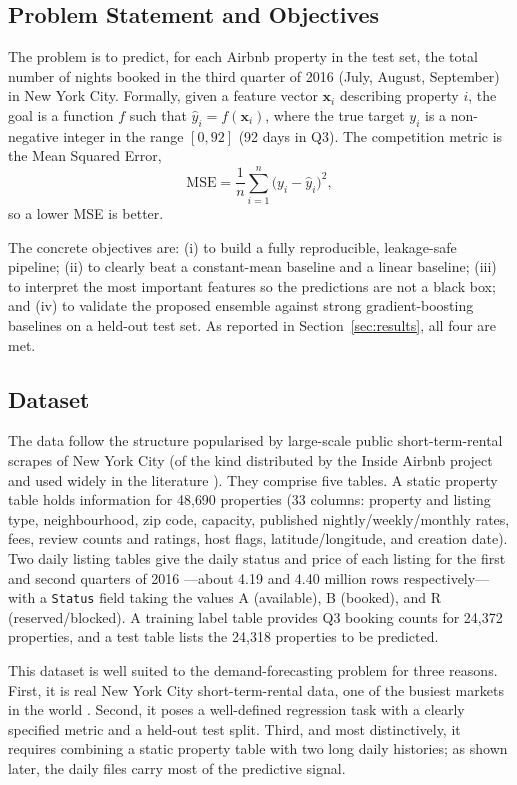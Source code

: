 \documentclass[journal]{IEEEtran}
\begin{document}
\subsection{Problem Statement and Objectives}
The problem is to predict, for each Airbnb property in the test set, the total
number of nights booked in the third quarter of 2016 (July, August, September)
in New York City. Formally, given a feature vector $\mathbf{x}_i$ describing
property $i$, the goal is a function $f$ such that
$\hat y_i = f(\mathbf{x}_i)$, where the true target $y_i$ is a non-negative
integer in the range $[0,92]$ (92 days in Q3). The competition metric is the
Mean Squared Error,
\begin{equation}
\text{MSE} = \frac{1}{n}\sum_{i=1}^{n}\big(y_i-\hat y_i\big)^{2},
\label{eq:mse}
\end{equation}
so a lower MSE is better.

The concrete objectives are: (i) to build a fully reproducible, leakage-safe
pipeline; (ii) to clearly beat a constant-mean baseline and a linear baseline;
(iii) to interpret the most important features so the predictions are not a
black box; and (iv) to validate the proposed ensemble against strong
gradient-boosting baselines on a held-out test set. As reported in
Section~\ref{sec:results}, all four are met.

\subsection{Dataset}
The data follow the structure popularised by large-scale public short-term-rental
scrapes of New York City (of the kind distributed by the Inside Airbnb project
and used widely in the literature \cite{kalehbasti2019}). They comprise five
tables. A static property table holds information for 48{,}690 properties (33
columns: property and listing type, neighbourhood, zip code, capacity, published
nightly/weekly/monthly rates, fees, review counts and ratings, host flags,
latitude/longitude, and creation date). Two daily listing tables give the daily
status and price of each listing for the first and second quarters of 2016
---about 4.19 and 4.40 million rows respectively---with a \texttt{Status} field
taking the values A (available), B (booked), and R (reserved/blocked). A training
label table provides Q3 booking counts for 24{,}372 properties, and a test table
lists the 24{,}318 properties to be predicted.

This dataset is well suited to the demand-forecasting problem for three reasons.
First, it is real New York City short-term-rental data, one of the busiest
markets in the world \cite{kalehbasti2019}. Second, it poses a well-defined
regression task with a clearly specified metric and a held-out test split.
Third, and most distinctively, it requires combining a static property table
with two long daily histories; as shown later, the daily files carry most of the
predictive signal.
\end{document}
